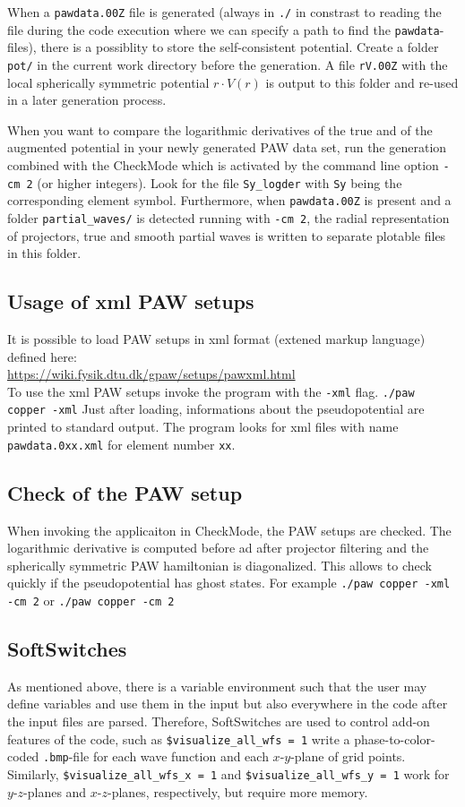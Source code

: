 \documentclass[12pt,BCOR8mm,noappendixprefix,nochapterprefix,bibtotoc,idxtotoc,openbib,tablecaptionabove]{scrbook}
\newcommand{\ttt}[1]{\texttt{#1}}
\begin{document}
When a \ttt{pawdata.00Z} file is generated (always in \ttt{./} in constrast to 
reading the file during the code execution where we can specify a path to find 
the \ttt{pawdata}-files), there is a possiblity to store the self-consistent potential. 
Create a folder \ttt{pot/} in the current work directory before the generation. 
A file \ttt{rV.00Z} with the local spherically symmetric potential $r \cdot V(r)$ is 
output to this folder and re-used in a later generation process.

When you want to compare the logarithmic derivatives of the true and of the augmented 
potential in your newly generated PAW data set, run the generation combined with the CheckMode 
which is activated by the command line option \ttt{-cm 2} (or higher integers). 
Look for the file \ttt{Sy\_logder} with \ttt{Sy} being the corresponding element symbol. 
Furthermore, when \ttt{pawdata.00Z} is present and a folder \ttt{partial\_waves/} 
is detected running with \ttt{-cm 2}, the radial representation of projectors, 
true and smooth partial waves is written to separate plotable files in this folder.


\subsection*{Usage of xml PAW setups}
It is possible to load PAW setups in xml format (extened markup language) defined here:\\
\url{https://wiki.fysik.dtu.dk/gpaw/setups/pawxml.html}\\
To use the xml PAW setups invoke 
the program with the \ttt{-xml} flag. \ttt{./paw copper -xml}
Just after loading, informations about the pseudopotential are printed to standard output. 
The program looks for xml files with name \ttt{pawdata.0xx.xml} for element number \ttt{xx}.
 

\subsection*{Check of the PAW setup}
When invoking the applicaiton in CheckMode, the PAW setups are checked. 
The logarithmic derivative is computed before ad after projector filtering 
and the spherically symmetric PAW hamiltonian is diagonalized. 
This allows to check quickly if the pseudopotential has ghost states.
For example \ttt{./paw copper -xml -cm 2} or \ttt{./paw copper -cm 2}

\subsection*{SoftSwitches}
As mentioned above, there is a variable environment such that the user 
may define variables and use them in the input but also everywhere 
in the code after the input files are parsed.
Therefore, SoftSwitches are used to control add-on features of the code, such as
\ttt{\$visualize\_all\_wfs = 1} write a phase-to-color-coded \ttt{.bmp}-file for each wave 
function and each $x$-$y$-plane of grid points.
Similarly, \ttt{\$visualize\_all\_wfs\_x = 1} and \ttt{\$visualize\_all\_wfs\_y = 1} 
work for $y$-$z$-planes and $x$-$z$-planes, respectively, but require more memory.
\end{document}
